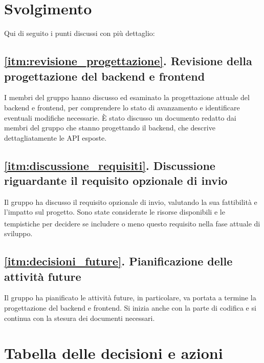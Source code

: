 \documentclass[a4paper,12pt]{article}
\begin{document}
\newpage
\section{Svolgimento}
Qui di seguito i punti discussi con più dettaglio:

\subsection*{\ref{itm:revisione_progettazione}. Revisione della progettazione del backend e frontend}
I membri del gruppo hanno discusso ed esaminato la progettazione attuale del backend e frontend, per comprendere lo stato di avanzamento e identificare eventuali modifiche necessarie. È stato discusso un documento redatto dai membri del gruppo che stanno progettando il backend, che descrive dettagliatamente le API esposte.

\subsection*{\ref{itm:discussione_requisiti}. Discussione riguardante il requisito opzionale di invio}
Il gruppo ha discusso il requisito opzionale di invio, valutando la sua fattibilità e l'impatto sul progetto\textsubscript{}. Sono state considerate le risorse disponibili e le tempistiche per decidere se includere o meno questo requisito nella fase attuale di sviluppo.

\subsection*{\ref{itm:decisioni_future}. Pianificazione delle attività future}
Il gruppo ha pianificato le attività future, in particolare, va portata a termine la progettazione del backend e frontend. Si inizia anche con la parte di codifica e si continua con la stesura dei documenti necessari.


\section{Tabella delle decisioni e azioni}

\setlength{\extrarowheight}{2pt} %
\renewcommand{\arraystretch}{1.5} 
\end{document}
